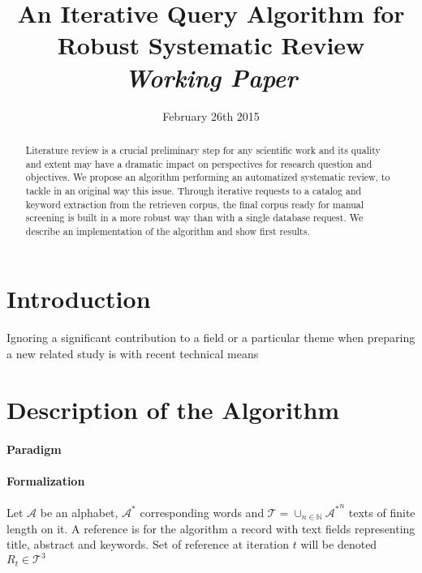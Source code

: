 


\title{An Iterative Query Algorithm for Robust Systematic Review\bigskip\\
\textit{Working Paper}
}
\author{}
\date{February 26th 2015}


\maketitle

\begin{abstract}
Literature review is a crucial preliminary step for any scientific work and its quality and extent may have a dramatic impact on perspectives for research question and objectives. We propose an algorithm performing an automatized systematic review, to tackle in an original way this issue. Through iterative requests to a catalog and keyword extraction from the retrieven corpus, the final corpus ready for manual screening is built in a more robust way than with a single database request. We describe an implementation of the algorithm and show first results.
\end{abstract}



\section{Introduction}
Ignoring a significant contribution to a field or a particular theme when preparing a new related study is with recent technical means 


\section{Description of the Algorithm}

\paragraph{Paradigm}


\paragraph{Formalization}
Let $\mathcal{A}$ be an alphabet, $\mathcal{A}^{\ast}$ corresponding words and $\mathcal{T}=\cup_{n\in \mathbb{N}}{\mathcal{A}^{\ast}}^n$ texts of finite length on it. A reference is for the algorithm a record with text fields representing title, abstract and keywords. Set of reference at iteration $t$ will be denoted $R_{t}\in \mathcal{T}^3$


